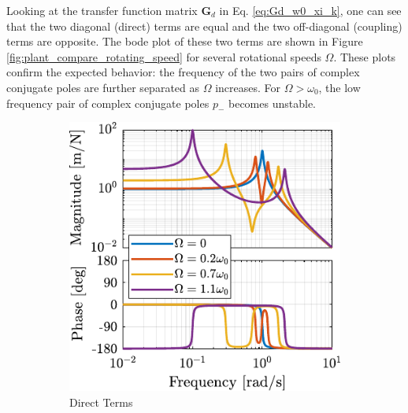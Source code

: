 \documentclass[10pt]{iopart}
\begin{document}
Looking at the transfer function matrix \(\bm{G}_d\) in Eq. \eqref{eq:Gd_w0_xi_k}, one can see that the two diagonal (direct) terms are equal and the two off-diagonal (coupling) terms are opposite.
The bode plot of these two terms are shown in Figure \ref{fig:plant_compare_rotating_speed} for several rotational speeds \(\Omega\).
These plots confirm the expected behavior: the frequency of the two pairs of complex conjugate poles are further separated as \(\Omega\) increases.
For \(\Omega > \omega_0\), the low frequency pair of complex conjugate poles \(p_{-}\) becomes unstable.

\begin{figure}[htbp]
\begin{subfigure}[c]{0.48\linewidth}
\includegraphics[width=\linewidth]{figs/plant_compare_rotating_speed_direct.pdf}
\caption{\label{fig:plant_compare_rotating_speed_direct} Direct Terms}
\end{subfigure}
\hfill
\begin{subfigure}[c]{0.48\linewidth}

\end{subfigure}
\end{figure}
\end{document}

